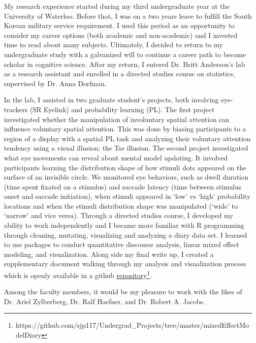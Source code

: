 \documentclass[12pt]{article}
\begin{document}
	My research experience started during my third undergraduate year at the University of Waterloo. Before that, I was on a two years leave to fulfill the South Korean military service requirement. I used this period as an opportunity to consider my career options (both academic and non-academic) and I invested time to read about many subjects. Ultimately, I decided to return to my undergraduate study with a galvanized will to continue a career path to become scholar in cognitive science. After my return, I entered Dr. Britt Anderson's lab as a research assistant and enrolled in a directed studies course on statistics, supervised by Dr. Anna Dorfman.
	
	In the lab, I assisted in two graduate student's projects, both involving eye-trackers (SR Eyelink) and probability learning (PL). The first project investigated whether the manipulation of involuntary spatial attention can influence voluntary spatial attention. This was done by biasing participants to a region of a display with a spatial PL task and analyzing their voluntary attention tendency using a visual illusion; the Tse illusion. The second project investigated what eye movements can reveal about mental model updating. It involved participants learning the distribution shape of how stimuli dots appeared on the surface of an invisible circle. We monitored eye behaviors, such as dwell duration (time spent fixated on a stimulus) and saccade latency (time between stimulus onset and saccade initiation), when stimuli appeared in `low' vs `high' probability locations and when the stimuli distribution shape was manipulated (`wide' to `narrow' and vice versa). Through a directed studies course, I developed my ability to work independently and I became more familiar with R programming through cleaning, mutating, visualizing and analyzing a diary data set. I learned to use packages to conduct quantitative discourse analysis, linear mixed effect modeling, and visualization. Along side my final write up, I created a supplementary document walking through my analysis and visualization process which is openly available in a github \href{https://github.com/sjp117/Undergrad_Projects/tree/master/mixedEffectModelDiary}{repository}\footnote{https://github.com/sjp117/Undergrad\_Projects/tree/master/mixedEffectModelDiary}.
	
	Among the faculty members, it would be my pleasure to work with the likes of Dr. Ariel Zylberberg, Dr. Ralf Haefner, and Dr. Robert A. Jacobs. 
	
\end{document}
